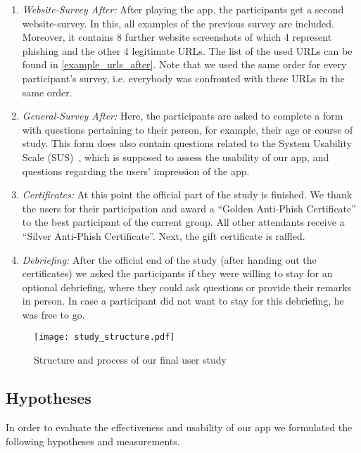 \begin{enumerate}
	\item \textit{Website-Survey After:} After playing the app, the participants get a second website-survey.
 In this, all examples of the previous survey are included.
 Moreover, it contains 8 further website screenshots of which 4 represent phishing and the other 4 legitimate URLs.
  The list of the used URLs can be found in \autoref{example_urls_after}.
Note that we used the same order for every participant's survey, i.e. everybody was confronted with these URLs in the same order.

	\item \textit{General-Survey After:} Here, the participants are asked to complete a form with questions pertaining to their person, for example, their age or course of study.
 This form does also contain questions related to the System Usability Scale (SUS)~\cite{sus}, which is supposed to assess the usability of our app, and questions regarding the users' impression of the app.
	
	\item \textit{Certificates:} At this point the official part of the study is finished.
We thank the users for their participation and award a ``Golden Anti-Phish Certificate'' to the best participant of the current group.
All other attendants receive a ``Silver Anti-Phish Certificate''.
Next, the gift certificate is raffled.

	\item \textit{Debriefing:} After the official end of the study (after handing out the certificates) we asked the participants if they were willing to stay for an optional debriefing, where they could ask questions or provide their remarks in person. In case a participant did not want to stay for this debriefing, he was free to go.
\end{enumerate}



\begin{figure}[hHtbp]
\centering
\texttt{[image: study\_structure.pdf]}%
\caption{Structure and process of our final user study}%
\label{fig:study_structure}%
\end{figure}

\subsection{Hypotheses}
In order to evaluate the effectiveness and usability of our app we formulated the following hypotheses and measurements.


